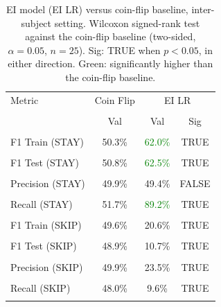 \begin{table}[H]
\centering
\begin{tabular}{lccc}
\hline
Metric & Coin Flip & \multicolumn{2}{c}{EI LR} \\\\
 & Val & Val & Sig \\\\
\hline
F1 Train (STAY) & 50.3\% & \textcolor{green}{62.0\%} & TRUE \\\\
F1 Test (STAY) & 50.8\% & \textcolor{green}{62.5\%} & TRUE \\\\
Precision (STAY) & 49.9\% & 49.4\% & FALSE \\\\
Recall (STAY) & 51.7\% & \textcolor{green}{89.2\%} & TRUE \\\\
F1 Train (SKIP) & 49.6\% & 20.6\% & TRUE \\\\
F1 Test (SKIP) & 48.9\% & 10.7\% & TRUE \\\\
Precision (SKIP) & 49.9\% & 23.5\% & TRUE \\\\
Recall (SKIP) & 48.0\% & 9.6\% & TRUE \\\\
\hline
\end{tabular}
\caption{EI model (EI LR) versus coin-flip baseline, inter-subject setting. Wilcoxon signed-rank test against the coin-flip baseline (two-sided, $\alpha=0.05$, $n=25$). Sig: TRUE when $p<0.05$, in either direction. Green: significantly higher than the coin-flip baseline.}
\label{tab:metrics_1_inter}
\end{table}